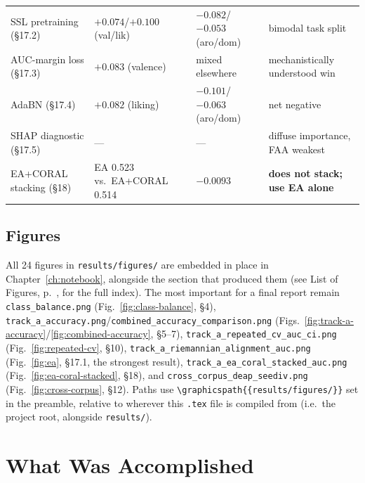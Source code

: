 \documentclass[11pt]{report}
\begin{document}
\begin{longtable}{p{5.5cm}p{2.3cm}p{2.1cm}p{4.3cm}}
SSL pretraining (\S17.2) & $+0.074$/$+0.100$ (val/lik) & $-0.082$/$-0.053$ (aro/dom) & bimodal task split \\
AUC-margin loss (\S17.3) & $+0.083$ (valence) & mixed elsewhere & mechanistically understood win \\
AdaBN (\S17.4) & $+0.082$ (liking) & $-0.101$/$-0.063$ (aro/dom) & net negative \\
SHAP diagnostic (\S17.5) & --- & --- & diffuse importance, FAA weakest \\
EA+CORAL stacking (\S18) & EA 0.523 vs.\ EA+CORAL 0.514 & $-0.0093$ & \textbf{does not stack; use EA alone} \\
\bottomrule
\end{longtable}

\section{Figures}
All 24 figures in \texttt{results/figures/} are embedded in place in
Chapter~\ref{ch:notebook}, alongside the section that produced them (see
List of Figures, p.~\pageref{fig:class-balance}, for the full index). The
most important for a final report remain \texttt{class\_balance.png}
(Fig.~\ref{fig:class-balance}, \S4),
\texttt{track\_a\_accuracy.png}/\texttt{combined\_accuracy\_comparison.png}
(Figs.~\ref{fig:track-a-accuracy}/\ref{fig:combined-accuracy}, \S5--7),
\texttt{track\_a\_repeated\_cv\_auc\_ci.png} (Fig.~\ref{fig:repeated-cv},
\S10), \texttt{track\_a\_riemannian\_alignment\_auc.png}
(Fig.~\ref{fig:ea}, \S17.1, the strongest result),
\texttt{track\_a\_ea\_coral\_stacked\_auc.png}
(Fig.~\ref{fig:ea-coral-stacked}, \S18), and
\texttt{cross\_corpus\_deap\_seediv.png} (Fig.~\ref{fig:cross-corpus},
\S12). Paths use \texttt{\textbackslash graphicspath\{\{results/figures/\}\}}
set in the preamble, relative to wherever this \texttt{.tex} file is
compiled from (i.e.\ the project root, alongside \texttt{results/}).

\chapter{What Was Accomplished}
\label{ch:done}
\end{document}

